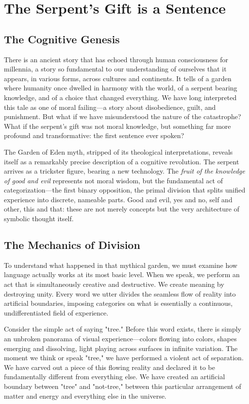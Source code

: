 \chapter{The Serpent's Gift is a Sentence}

\section{The Cognitive Genesis}

There is an ancient story that has echoed through human consciousness for millennia, a story so fundamental to our understanding of ourselves that it appears, in various forms, across cultures and continents. It tells of a garden where humanity once dwelled in harmony with the world, of a serpent bearing knowledge, and of a choice that changed everything. We have long interpreted this tale as one of moral failing—a story about disobedience, guilt, and punishment. But what if we have misunderstood the nature of the catastrophe? What if the serpent's gift was not moral knowledge, but something far more profound and transformative: the first sentence ever spoken?

The Garden of Eden myth, stripped of its theological interpretations, reveals itself as a remarkably precise description of a cognitive revolution. The serpent arrives as a trickster figure, bearing a new technology. The \textit{fruit of the knowledge of good and evil} represents not moral wisdom, but the fundamental act of categorization—the first binary opposition, the primal division that splits unified experience into discrete, nameable parts. Good and evil, yes and no, self and other, this and that: these are not merely concepts but the very architecture of symbolic thought itself.

\section{The Mechanics of Division}

To understand what happened in that mythical garden, we must examine how language actually works at its most basic level. When we speak, we perform an act that is simultaneously creative and destructive. We create meaning by destroying unity. Every word we utter divides the seamless flow of reality into artificial boundaries, imposing categories on what is essentially a continuous, undifferentiated field of experience.

Consider the simple act of saying "tree." Before this word exists, there is simply an unbroken panorama of visual experience—colors flowing into colors, shapes emerging and dissolving, light playing across surfaces in infinite variation. The moment we think or speak "tree," we have performed a violent act of separation. We have carved out a piece of this flowing reality and declared it to be fundamentally different from everything else. We have created an artificial boundary between "tree" and "not-tree," between this particular arrangement of matter and energy and everything else in the universe.

